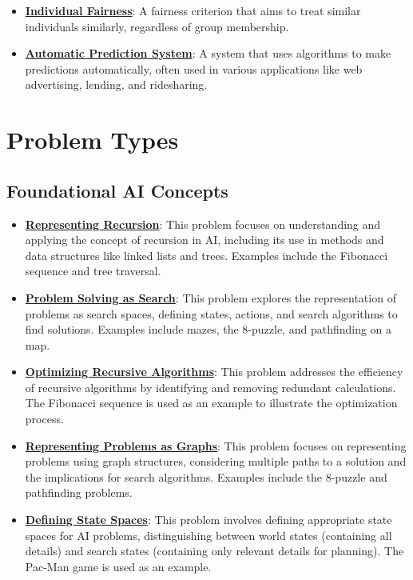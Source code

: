 \documentclass{article}%
\begin{document}
\begin{itemize}[leftmargin=*]
\item \href{https://www.math.purdue.edu/~yipn/351/16L2-ethics.pdf#page=27}{\textbf{Individual Fairness}}: A fairness criterion that aims to treat similar individuals similarly, regardless of group membership.%
\item \href{https://www.math.purdue.edu/~yipn/351/16L2-ethics.pdf#page=4}{\textbf{Automatic Prediction System}}: A system that uses algorithms to make predictions automatically, often used in various applications like web advertising, lending, and ridesharing.%
\end{itemize}

%
\section{Problem Types}%
\label{sec:ProblemTypes}%
\subsection{Foundational AI Concepts}%
\label{subsec:FoundationalAIConcepts}%
\begin{itemize}[leftmargin=*]%
\item \href{https://www.math.purdue.edu/~yipn/351/14L1-DepthFS.pdf#page=3}{\textbf{Representing Recursion}}: This problem focuses on understanding and applying the concept of recursion in AI, including its use in methods and data structures like linked lists and trees. Examples include the Fibonacci sequence and tree traversal.%
\item \href{https://www.math.purdue.edu/~yipn/351/14L1-DepthFS.pdf#page=12}{\textbf{Problem Solving as Search}}: This problem explores the representation of problems as search spaces, defining states, actions, and search algorithms to find solutions. Examples include mazes, the 8-puzzle, and pathfinding on a map.%
\item \href{https://www.math.purdue.edu/~yipn/351/14L1-DepthFS.pdf#page=21}{\textbf{Optimizing Recursive Algorithms}}: This problem addresses the efficiency of recursive algorithms by identifying and removing redundant calculations. The Fibonacci sequence is used as an example to illustrate the optimization process.%
\item \href{https://www.math.purdue.edu/~yipn/351/14L1-DepthFS.pdf#page=25}{\textbf{Representing Problems as Graphs}}: This problem focuses on representing problems using graph structures, considering multiple paths to a solution and the implications for search algorithms. Examples include the 8-puzzle and pathfinding problems.%
\item \href{https://www.math.purdue.edu/~yipn/351/14L1-DepthFS.pdf#page=37}{\textbf{Defining State Spaces}}: This problem involves defining appropriate state spaces for AI problems, distinguishing between world states (containing all details) and search states (containing only relevant details for planning). The Pac-Man game is used as an example.%
\end{itemize}
\end{document}
